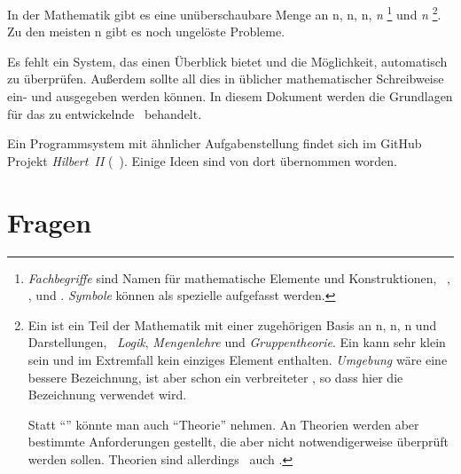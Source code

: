 In der Mathematik gibt es eine unüberschaubare Menge an n, n, n, \emph{n}%
\footnote{%
	\emph{Fachbegriffe} sind Namen für mathematische Elemente und Konstruktionen, \textzB\ , ,  und .
	\emph{Symbole} können als spezielle  aufgefasst werden.%
}
und \emph{n}%
\footnote{%
	Ein \emph{} ist ein Teil der Mathematik mit einer zugehörigen Basis an n, n, n und Darstellungen, \textzB\ \emph{Logik}, \emph{Mengenlehre} und \emph{Gruppentheorie}.
	Ein  kann sehr klein sein und im Extremfall kein einziges Element enthalten.
	\emph{Umgebung} wäre eine bessere Bezeichnung, ist aber schon ein verbreiteter , so dass hier die Bezeichnung  verwendet wird.

	Statt \enquote{} könnte man auch \enquote{Theorie} nehmen.
	An Theorien werden aber bestimmte Anforderungen gestellt, die aber nicht notwendigerweise überprüft werden sollen.
	Theorien sind allerdings \textiAlg\ auch .
}.
Zu den meisten n gibt es noch ungelöste Probleme.

Es fehlt ein System, das einen Überblick bietet und die Möglichkeit,  automatisch zu überprüfen.
Außerdem sollte all dies in üblicher mathematischer Schreibweise ein- und ausgegeben werden können.
In diesem Dokument werden die Grundlagen für das zu entwickelnde \ASBA\ behandelt.

Ein Programmsystem mit ähnlicher Aufgabenstellung findet sich im GitHub Projekt \emph{Hilbert~II} (\seename~\cite{bib:HilbertII, bib:qedeq}).
Einige Ideen sind von dort übernommen worden.

\section{Fragen}%
\label{sec:Fragen}

